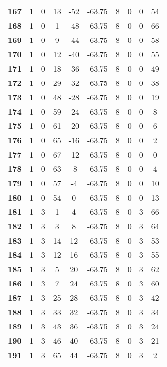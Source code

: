 \documentclass[12pt,letterpaper, onecolumn]{exam}
\begin{document}
\begin{longtable}{cccccccccc}
    \textbf{167} & 1 & 0 & 13 & -52 & -63.75 & 8 & 0 & 0 & 54 \\ 
    \textbf{168} & 1 & 0 & 1 & -48 & -63.75 & 8 & 0 & 0 & 66 \\ 
    \textbf{169} & 1 & 0 & 9 & -44 & -63.75 & 8 & 0 & 0 & 58 \\ 
    \textbf{170} & 1 & 0 & 12 & -40 & -63.75 & 8 & 0 & 0 & 55 \\ 
    \textbf{171} & 1 & 0 & 18 & -36 & -63.75 & 8 & 0 & 0 & 49 \\ 
    \textbf{172} & 1 & 0 & 29 & -32 & -63.75 & 8 & 0 & 0 & 38 \\ 
    \textbf{173} & 1 & 0 & 48 & -28 & -63.75 & 8 & 0 & 0 & 19 \\ 
    \textbf{174} & 1 & 0 & 59 & -24 & -63.75 & 8 & 0 & 0 & 8 \\ 
    \textbf{175} & 1 & 0 & 61 & -20 & -63.75 & 8 & 0 & 0 & 6 \\ 
    \textbf{176} & 1 & 0 & 65 & -16 & -63.75 & 8 & 0 & 0 & 2 \\ 
    \textbf{177} & 1 & 0 & 67 & -12 & -63.75 & 8 & 0 & 0 & 0 \\ 
    \textbf{178} & 1 & 0 & 63 & -8 & -63.75 & 8 & 0 & 0 & 4 \\ 
    \textbf{179} & 1 & 0 & 57 & -4 & -63.75 & 8 & 0 & 0 & 10 \\ 
    \textbf{180} & 1 & 0 & 54 & 0 & -63.75 & 8 & 0 & 0 & 13 \\ 
    \textbf{181} & 1 & 3 & 1 & 4 & -63.75 & 8 & 0 & 3 & 66 \\ 
    \textbf{182} & 1 & 3 & 3 & 8 & -63.75 & 8 & 0 & 3 & 64 \\ 
    \textbf{183} & 1 & 3 & 14 & 12 & -63.75 & 8 & 0 & 3 & 53 \\ 
    \textbf{184} & 1 & 3 & 12 & 16 & -63.75 & 8 & 0 & 3 & 55 \\ 
    \textbf{185} & 1 & 3 & 5 & 20 & -63.75 & 8 & 0 & 3 & 62 \\ 
    \textbf{186} & 1 & 3 & 7 & 24 & -63.75 & 8 & 0 & 3 & 60 \\ 
    \textbf{187} & 1 & 3 & 25 & 28 & -63.75 & 8 & 0 & 3 & 42 \\ 
    \textbf{188} & 1 & 3 & 33 & 32 & -63.75 & 8 & 0 & 3 & 34 \\ 
    \textbf{189} & 1 & 3 & 43 & 36 & -63.75 & 8 & 0 & 3 & 24 \\ 
    \textbf{190} & 1 & 3 & 46 & 40 & -63.75 & 8 & 0 & 3 & 21 \\ 
    \textbf{191} & 1 & 3 & 65 & 44 & -63.75 & 8 & 0 & 3 & 2 \\ 

\end{longtable}
\end{document}
